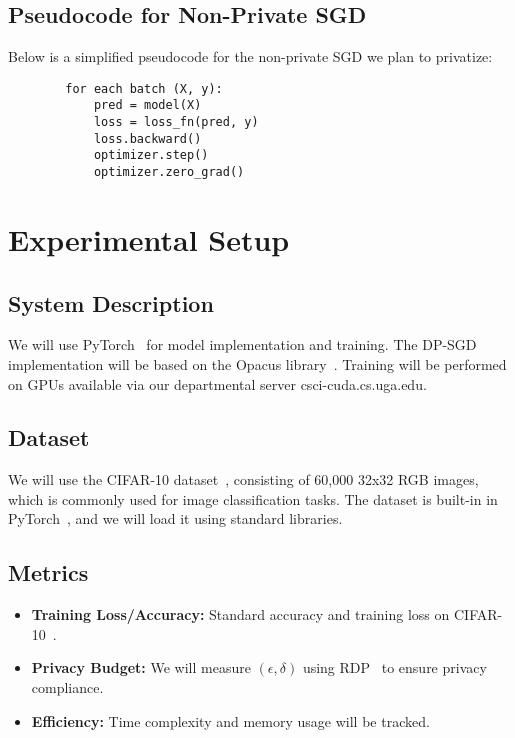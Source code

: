 \documentclass{article}
\begin{document}
    \subsection{Pseudocode for Non-Private SGD}\label{subsec:pseudo-code-for-non-private-sgd}
    Below is a simplified pseudocode for the non-private SGD we plan to privatize:
    \begin{verbatim}
        for each batch (X, y):
            pred = model(X)
            loss = loss_fn(pred, y)
            loss.backward()
            optimizer.step()
            optimizer.zero_grad()
    \end{verbatim}


    \section{Experimental Setup}\label{sec:experimental-setup}

    \subsection{System Description}\label{subsec:system-description}
    We will use PyTorch~\cite{pytorch_2019} for model implementation and training.
    The DP-SGD~\cite{Abadi_2016_DeepLearningDifferentialPrivacy} implementation will be based on the Opacus library~\cite{opacus}.
    Training will be performed on GPUs available via our departmental server csci-cuda.cs.uga.edu.

    \subsection{Dataset}\label{subsec:dataset}
    We will use the CIFAR-10 dataset~\cite{cifar10_dataset}, consisting of 60,000 32x32 RGB images, which is commonly used for
    image classification tasks.
    The dataset is built-in in PyTorch~\cite{pytorch_2019}, and we will load it using standard libraries.

    \subsection{Metrics}\label{subsec:metrics}
    \begin{itemize}
        \item \textbf{Training Loss/Accuracy:} Standard accuracy and training loss on CIFAR-10~\cite{cifar10_dataset}.
        \item \textbf{Privacy Budget:} We will measure $(\epsilon, \delta)$ using RDP~\cite{Mironov_2017_RenyiDP} to ensure privacy compliance.
        \item \textbf{Efficiency:} Time complexity and memory usage will be tracked.
    \end{itemize}
\end{document}
